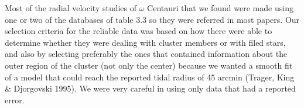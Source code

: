 Most of the radial velocity studies of $\omega$ Centauri that we found were made using one or two of the databases of table 3.3 so they were referred in most papers. Our selection criteria for the reliable data was based on how there were able to determine whether they were dealing with cluster members or with filed stars, and also by selecting preferably the ones that contained information about the outer region of the cluster (not only the center) because we wanted a smooth fit of a model that could reach the reported tidal radius of 45 arcmin (Trager, King \& Djorgovski 1995). We were very careful in using only data that had a reported error.